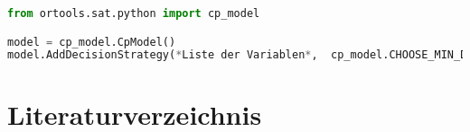 \documentclass[12pt,a4paper]{article}
\begin{document}
\begin{lstlisting}[language=Python,
  caption={First-Fail-Nachbildung in Python},
  label={lst:ff-in-python}]
from ortools.sat.python import cp_model

model = cp_model.CpModel()
model.AddDecisionStrategy(*Liste der Variablen*,  cp_model.CHOOSE_MIN_DOMAIN_SIZE, cp_model.SELECT_MIN_VALUE)
\end{lstlisting}


\section{Literaturverzeichnis}
\renewcommand*{\bibname}{}
\renewcommand*{\refname}{}
\printbibliography
\end{document}
